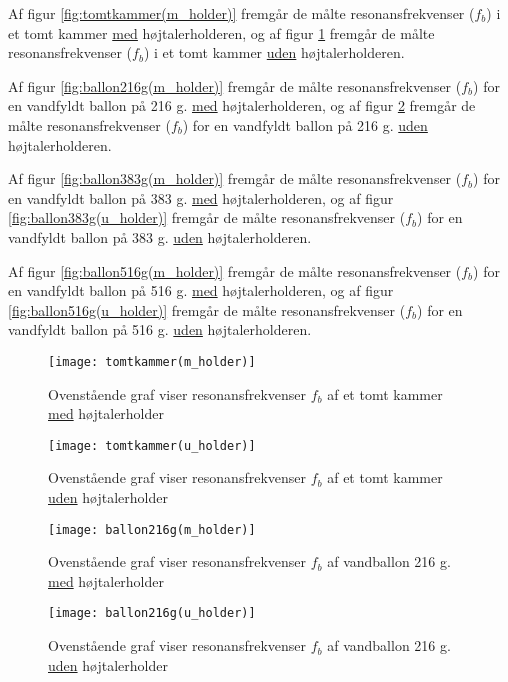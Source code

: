 Af figur \ref{fig:tomtkammer(m_holder)} fremgår de målte resonansfrekvenser ($f_{b}$) i et tomt kammer \underline{med} højtalerholderen, og af figur \ref{fig:tomtkammer(u_holder)} fremgår de målte resonansfrekvenser ($f_{b}$) i et tomt kammer \underline{uden} højtalerholderen. 

Af figur \ref{fig:ballon216g(m_holder)} fremgår de målte resonansfrekvenser ($f_{b}$) for en vandfyldt ballon på 216 g. \underline{med} højtalerholderen, og af figur \ref{fig:ballon216g(u_holder)} fremgår de målte resonansfrekvenser ($f_{b}$) for en vandfyldt ballon på 216 g. \underline{uden} højtalerholderen.  

Af figur \ref{fig:ballon383g(m_holder)} fremgår de målte resonansfrekvenser ($f_{b}$) for en vandfyldt ballon på 383 g. \underline{med} højtalerholderen, og af figur \ref{fig:ballon383g(u_holder)} fremgår de målte resonansfrekvenser ($f_{b}$) for en vandfyldt ballon på 383 g. \underline{uden} højtalerholderen.  

Af figur \ref{fig:ballon516g(m_holder)} fremgår de målte resonansfrekvenser ($f_{b}$) for en vandfyldt ballon på 516 g. \underline{med} højtalerholderen, og af figur \ref{fig:ballon516g(u_holder)} fremgår de målte resonansfrekvenser ($f_{b}$) for en vandfyldt ballon på 516 g. \underline{uden} højtalerholderen.  

\begin{figure}[!h]
  \begin{minipage}[b]{1\linewidth}
    \centering
    \texttt{[image: tomtkammer(m\_holder)]}
    \caption{Ovenstående graf viser resonansfrekvenser $f_{b}$ af et tomt kammer \underline{med} højtalerholder}
    \label{fig:tomtkammer(m_holder)}
  \end{minipage}
  \hspace{1cm}
  \begin{minipage}[b]{1\linewidth}
    \centering
    \texttt{[image: tomtkammer(u\_holder)]}
    \caption{Ovenstående graf viser resonansfrekvenser $f_{b}$ af et tomt kammer \underline{uden} højtalerholder}
    \label{fig:tomtkammer(u_holder)}
  \end{minipage}
\end{figure}


\begin{figure}[htbp]
  \begin{minipage}[b]{1\linewidth}
    \centering
    \texttt{[image: ballon216g(m\_holder)]}
    \caption{Ovenstående graf viser resonansfrekvenser $f_{b}$  af vandballon 216 g. \underline{med} højtalerholder}
    \label{fig:ballon216g(m_holder)}
  \end{minipage}
  \hspace{1cm}
  \begin{minipage}[b]{1\linewidth}
    \centering
    \texttt{[image: ballon216g(u\_holder)]}
    \caption{Ovenstående graf viser resonansfrekvenser $f_{b}$  af vandballon 216 g. \underline{uden} højtalerholder}
    \label{fig:ballon216g(u_holder)}
  \end{minipage}
\end{figure}

